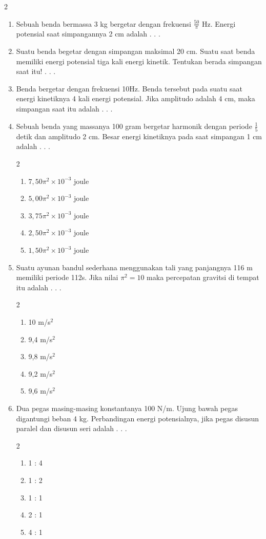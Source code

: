 \documentclass[10pt,a4paper]{extarticle}
\newcommand{\pilgani}[1]{                            \vspace{-0.3cm}\begin{multicols}{2}
 \begin{enumerate}[label=\Alph*., itemsep=0pt,topsep=0pt,leftmargin=*,align=Center]#1                     \end{enumerate}
 \phantom{ini cuma sapi, wedus, dan ayam}
 \end{multicols}}
\begin{document}
\begin{multicols*}{2}
\begin{enumerate}
\item Sebuah benda bermassa 3 kg bergetar dengan frekuensi $\frac{50}{\pi}$ Hz. Energi potensial saat simpangannya 2 cm adalah . . .  

\vspace{3cm}

\item Suatu benda begetar dengan simpangan maksimal 20 cm. Suatu saat benda memiliki energi potensial tiga kali energi kinetik. Tentukan berada simpangan saat itu! . . . 
\vspace{4cm}

\item Benda bergetar dengan frekuensi 10Hz. Benda tersebut pada suatu saat energi kinetiknya 4 kali energi potensial. Jika amplitudo adalah 4 cm, maka simpangan saat itu adalah . . . 
\vspace{4cm}

\item Sebuah benda yang massanya 100 gram bergetar harmonik dengan periode $\frac{1}{5}$ detik dan amplitudo 2 cm. Besar energi kinetiknya pada saat simpangan 1 cm adalah . . .
\pilgani{
   \item $7,50 \pi^2 \times 10^{-3}$ joule
   \item $5,00 \pi^2 \times 10^{-3}$ joule
   \item $3,75 \pi^2 \times 10^{-3}$ joule
   \item $2,50\pi^2 \times 10^{-3}$ joule
   \item $1,50 \pi^2 \times 10^{-3}$ joule
}
\vspace{3cm}
\item Suatu ayunan bandul sederhana menggunakan tali yang panjangnya 116 m memiliki periode 112s. Jika nilai $\pi^2=10$ maka percepatan gravitsi di tempat itu adalah . . .
\pilgani{
   \item 10 m/s$^2$
   \item 9,4 m/s$^2$
   \item 9,8 m/s$^2$
   \item 9,2 m/s$^2$
   \item 9,6 m/s$^2$}
\vspace{3cm}

\item Dua pegas masing-masing konstantanya 100 N/m. Ujung bawah pegas digantungi beban 4 kg. Perbandingan energi potensialnya, jika pegas disusun paralel dan disusun seri adalah . . .
\pilgani{
   \item 1 : 4
   \item 1 :  2
   \item 1 : 1
   \item 2 : 1
   \item 4 : 1
}
\vspace{3cm}


\end{enumerate}
\end{multicols*}
\end{document}

